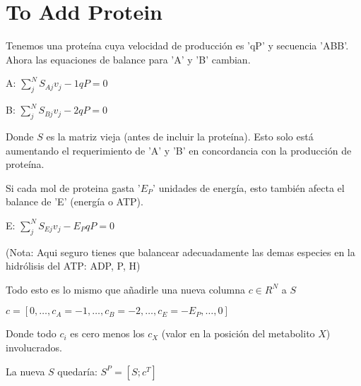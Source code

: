 \section{To Add Protein}

Tenemos una proteína cuya velocidad de producción es 'qP' y secuencia 'ABB'.
Ahora las equaciones de balance para 'A' y 'B' cambian.

A: $\sum_j^N S_{Aj} v_j - 1 qP = 0$

B: $\sum_j^N S_{Bj} v_j - 2 qP = 0$

Donde $S$ es la matriz vieja (antes de incluir la proteína).
Esto solo está aumentando el requerimiento de 'A' y 'B' en concordancia con la producción de proteína.


Si cada mol de proteina gasta '$E_P$' unidades de energía, esto también afecta el balance de 'E' (energía o ATP).

E: $\sum_j^N S_{Ej} v_j - E_P qP = 0$

(Nota: Aqui seguro tienes que balancear adecuadamente las demas especies en la hidrólisis del ATP: ADP, P, H)


Todo esto es lo mismo que añadirle una nueva columna $c \in R^N$ a $S$

$c = [0, \dots, c_A = -1, \dots, c_B = -2, \dots, c_E = -E_P, \dots, 0]$

Donde todo $c_i$ es cero menos los $c_X$ (valor en la posición del metabolito $X$) involucrados.

La nueva $S$ quedaría:
$S^P = [S; c^T]$
